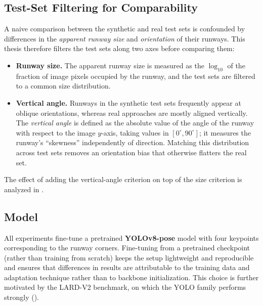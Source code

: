 \subsection{Test-Set Filtering for Comparability}
\label{subsec:setup-filtering}
A naive comparison between the synthetic and real test sets is confounded by
differences in the \emph{apparent runway size} and \emph{orientation} of their
runways. This thesis therefore filters the test sets along two axes before comparing
them:
\begin{itemize}
    \item \textbf{Runway size.} The apparent runway size is measured as the
    $\log_{10}$ of the fraction of image pixels occupied by the runway, and the test
    sets are filtered to a common size distribution.
    \item \textbf{Vertical angle.} Runways in the synthetic test sets frequently
    appear at oblique orientations, whereas real approaches are mostly aligned
    vertically. The \emph{vertical angle} is defined as the absolute value of the
    angle of the runway with respect to the image $y$-axis, taking values in
    $[0^\circ, 90^\circ]$; it measures the runway's ``skewness'' independently of
    direction. Matching this distribution across test sets removes an orientation
    bias that otherwise flatters the real set.
\end{itemize}
The effect of adding the vertical-angle criterion on top of the size criterion is
analyzed in .

\subsection{Model}
\label{subsec:setup-model}
All experiments fine-tune a pretrained \textbf{YOLOv8-pose} model with four keypoints
corresponding to the runway corners. Fine-tuning from a pretrained checkpoint (rather
than training from scratch) keeps the setup lightweight and reproducible and ensures
that differences in results are attributable to the training data and adaptation
technique rather than to backbone initialization. This choice is further motivated by
the LARD-V2 benchmark, on which the YOLO family performs strongly
().

